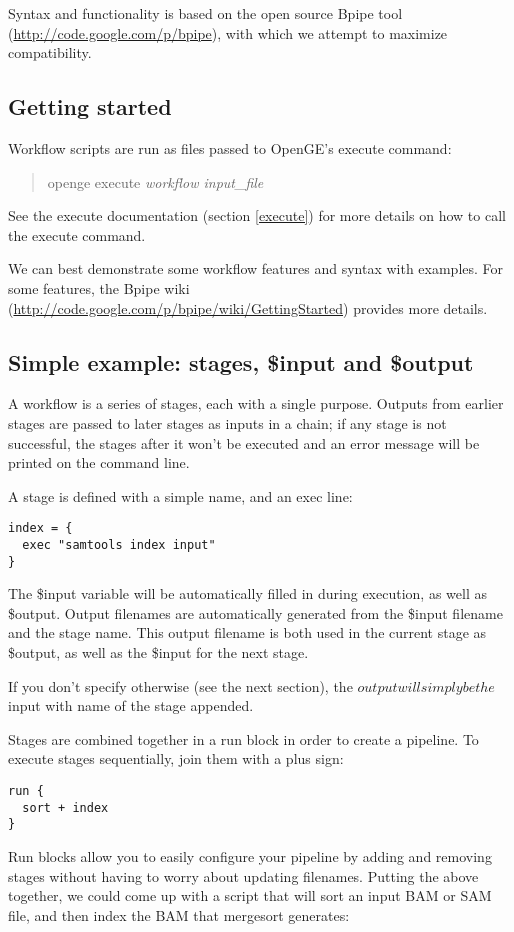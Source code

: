 \documentclass[11pt]{article}
\newcommand {\cmd}[1] {\begin{quote}#1\end{quote}}
\begin{document}
Syntax and functionality is based on the open source Bpipe tool (\url{http://code.google.com/p/bpipe}), with which we attempt to maximize compatibility.

\subsection {Getting started}
Workflow scripts are run as files passed to OpenGE's execute command:

\cmd{openge execute \textit{workflow input\_file}}

See the execute documentation (section \ref{execute}) for more details on how to call the execute command.

We can best demonstrate some workflow features and syntax with examples. For some features, the Bpipe wiki (\url{http://code.google.com/p/bpipe/wiki/GettingStarted}) provides more details.

\subsection {Simple example: stages, \$input and \$output}
A workflow is a series of stages, each with a single purpose. Outputs from earlier stages are passed to later stages as inputs in a chain; if any stage is not successful, the stages after it won't be executed and an error message will be printed on the command line.

A stage is defined with a simple name, and an exec line:
\begin{verbatim}
index = {
  exec "samtools index input"
}
\end{verbatim}

The \$input variable will be automatically filled in during execution, as well as \$output. Output filenames are automatically generated from the \$input filename and the stage name. This output filename is both used in the current stage as \$output, as well as the \$input for the next stage.

If you don't specify otherwise (see the next section), the $output will simply be the $input with name of the stage appended.

Stages are combined together in a run block in order to create a pipeline. To execute stages sequentially, join them with a plus sign:
\begin{verbatim}
run {
  sort + index
}
\end{verbatim}
Run blocks allow you to easily configure your pipeline by adding and removing stages without having to worry about updating filenames. Putting the above together, we could come up with a script that will sort an input BAM or SAM file, and then index the BAM that mergesort generates:
\end{document}
